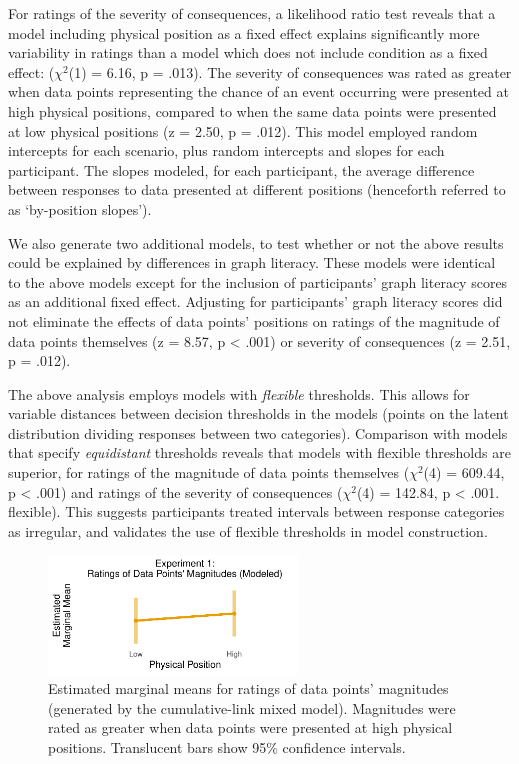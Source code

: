 \documentclass[journal]{vgtc}                %
\begin{document}
For ratings of the severity of consequences, a likelihood ratio test
reveals that a model including physical position as a fixed effect
explains significantly more variability in ratings than a model which
does not include condition as a fixed effect:
(\(\chi^2\)(1) = 6.16, p
= .013). The severity of consequences was
rated as greater when data points representing the chance of an event
occurring were presented at high physical positions, compared to when
the same data points were presented at low physical positions (z =
2.50, p
= .012). This model employed random
intercepts for each scenario, plus random intercepts and slopes for each
participant. The slopes modeled, for each participant, the average
difference between responses to data presented at different positions
(henceforth referred to as `by-position slopes').

We also generate two additional models, to test whether or not the above
results could be explained by differences in graph literacy. These
models were identical to the above models except for the inclusion of
participants' graph literacy scores as an additional fixed effect.
Adjusting for participants' graph literacy scores did not eliminate the
effects of data points' positions on ratings of the magnitude of data
points themselves (z = 8.57, p
\textless{} .001) or severity of
consequences (z = 2.51, p
= .012).

The above analysis employs models with \emph{flexible} thresholds. This
allows for variable distances between decision thresholds in the models
(points on the latent distribution dividing responses between two
categories). Comparison with models that specify \emph{equidistant}
thresholds reveals that models with flexible thresholds are superior,
for ratings of the magnitude of data points themselves
(\(\chi^2\)(4) = 609.44, p
\textless{} .001) and ratings of the severity of
consequences (\(\chi^2\)(4) =
142.84, p \textless{} .001.
flexible). This suggests participants treated
intervals between response categories as irregular, and validates the
use of flexible thresholds in model construction.

\begin{figure}
\includegraphics[width=250px]{position_magnitude_files/figure-latex/r1-c-emm-plot-1} \caption{Estimated marginal means for ratings of data points' magnitudes (generated by the cumulative-link mixed model). Magnitudes were rated as greater when data points were presented at high physical positions. Translucent bars show 95\% confidence intervals.}\label{fig:r1-c-emm-plot}
\end{figure}
\end{document}
